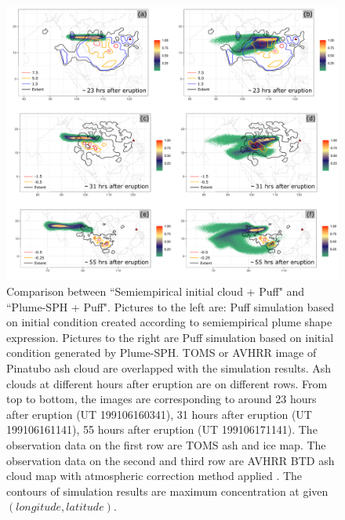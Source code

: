\documentclass[utf8]{frontiersSCNS} %
\begin{document}
\begin{figure}[!htb]
\centering
\includegraphics[width=0.99 \textwidth]{Figures/bent_plume}
\caption{Comparison between ``Semiempirical initial cloud + Puff" and ``Plume-SPH + Puff". Pictures to the left are: Puff simulation based on initial condition created according to semiempirical plume shape expression. Pictures to the right are Puff simulation based on initial condition generated by Plume-SPH. TOMS or AVHRR image of Pinatubo ash cloud are overlapped with the simulation results. Ash clouds at different hours after eruption are on different rows. From top to bottom, the images are corresponding to around 23 hours after eruption (UT 199106160341), 31 hours after eruption (UT 199106161141), 55 hours after eruption (UT 199106171141). The observation data on the first row are TOMS ash and ice map. The observation data on the second and third row are AVHRR BTD ash cloud map with atmospheric correction method applied \citep{guo2004particles}. The contours of simulation results are maximum concentration at given $(longitude, latitude)$.}
\label{fig:Plume-SPH-Puff-ash-cloud}
\end{figure}
\end{document}
